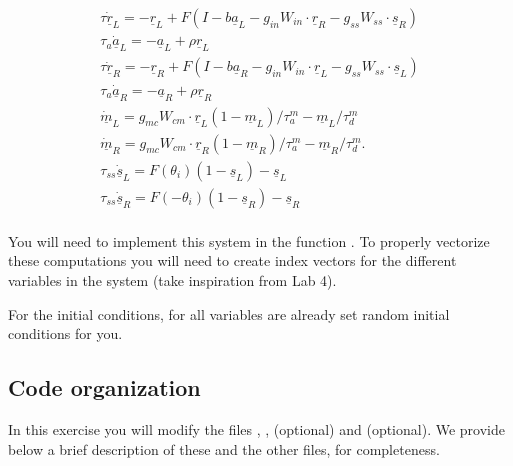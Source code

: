 \documentclass{cmc}
\begin{document}
\begin{equation}
    \begin{array}{lcl}
	\tau \dot{\underline{r}}_{L} = -\underline{r}_L + F(I-b \underline{a}_L - g_{in} W_{in} \cdot \underline{r}_R - g_{ss} W_{ss} \cdot \underline{s}_R )\\
	\tau_a \dot{\underline{a}}_L = -\underline{a}_L + \rho \underline{r}_L \\
	\tau \dot{\underline{r}}_{R} = -\underline{r}_R + F(I-b \underline{a}_R - g_{in} W_{in} \cdot \underline{r}_L - g_{ss} W_{ss} \cdot \underline{s}_L )\\
	\tau_a \dot{\underline{a}}_R = -\underline{a}_R + \rho \underline{r}_R \\
	\dot{\underline{m}}_L = g_{mc} W_{cm} \cdot \underline{r}_L (1-\underline{m}_L) / \tau^m_a - \underline{m}_L/ \tau^m_d\\
	\dot{\underline{m}}_R = g_{mc} W_{cm} \cdot \underline{r}_R (1-\underline{m}_R) / \tau^m_a - \underline{m}_R/ \tau^m_d. \\
	\tau_{ss} \dot{\underline{s}}_L = F(\theta_i) (1-\underline{s}_L) - \underline{s}_L\\
	\tau_{ss} \dot{\underline{s}}_R = F(-\theta_i) (1-\underline{s}_R) - \underline{s}_R\\
    \end{array}
	\label{eq:equations_vectorial}
\end{equation}

You will need to implement this system in the function . To properly vectorize these computations you will need to create index vectors for the different variables in the system (take inspiration from Lab 4).

For the initial conditions, for all variables are already set random initial conditions for you.


\subsection*{Code organization}\label{subsec:code}

In this exercise you will modify the files , ,  (optional) and  (optional). We provide below
a brief description of these and the other files, for completeness.
\end{document}
